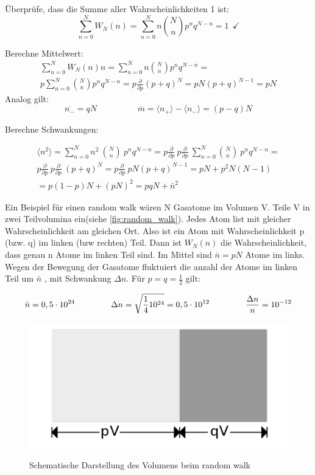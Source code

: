 \documentclass[ngerman]{scrartcl}
\begin{document}
	Überprüfe, dass die Summe aller Wahrscheinlichkeiten 1 ist:
	\begin{equation}
		\sum_{n=0}^N W_N(n) = \sum_{n=0}^N n \binom{N}{n}p^n q^{N-n} = 1 ~~\checkmark
	\end{equation}
	
	Berechne Mittelwert:
	\begin{gather}
		\sum^N_{n=0} W_N(n)n = 
		\sum_{n=0}^N n\binom{N}{n} p^n  q^{N-n} = 
		\\p\sum_{n=0}^{N}\binom{N}{n} p^n q^{N-n}=
		p\frac{\partial}{\partial p} (p+q)^N = pN(p+q)^{N-1}=pN
	\end{gather}
	Analog gilt:
	\begin{equation}
		\overline{n_-} = qN \hspace{2cm} \overline{m} = \langle n_+\rangle - \langle n_-\rangle = (p-q)N
	\end{equation}
	
	Berechne Schwankungen:
	
	\begin{gather}
		\langle n^2 \rangle = \sum_{n=0}^N n^2 ~\binom {N}{n}~ p^n q^{N-n} = p \frac{\partial}{\partial p}~ p \frac{\partial}{\partial p} ~\sum_{n=0}^N \binom{N}{n}~ p^n q^{N-n}=\\
		p \frac{\partial}{\partial p}~ p \frac{\partial}{\partial p}~(p+q)^N = p \frac{\partial}{\partial p}~ pN(p+q)^{N-1} = pN + p^2N(N-1) \\= p(1-p)N + (pN)^2 = pqN + \bar{n}^2
	\end{gather}
	
	Ein Beispiel für einen random walk wären N Gasatome im Volumen V. Teile V in zwei Teilvolumina ein(siehe \autoref{fig:random_walk}). Jedes Atom list mit gleicher Wahrscheinlichkeit am gleichen Ort. Also ist ein Atom mit Wahrscheinlichkeit p (bzw. q) im linken (bzw rechten) Teil. Dann ist $W_N(n)$ die Wahrscheinlichkeit, dass genau n Atome im linken Teil sind. Im Mittel sind $\bar{n}=pN$ Atome im links. Wegen der Bewegung der Gasatome fluktuiert die anzahl der Atome im linken Teil um $\bar{n}$ , mit Schwankung $\Delta n$. Für $p=q=\frac{1}{2}$ gilt:
	
	\begin{equation}
		\bar{n}=0,5 \cdot 10^{24} \hspace{1.5cm} \Delta n = \sqrt{\frac{1}{4}10^{24}}=0,5\cdot 10^{12} \hspace{1.5cm}  \frac{\Delta n}{n}=10^{-12}
	\end{equation}
	
	\begin{figure}[h]
		\centering
		\includegraphics[width=0.7\linewidth]{random_walk}
		\label{fig:random_walk}
		\caption{Schematische Darstellung des Volumens beim random walk}
	\end{figure}
	
\end{document}
